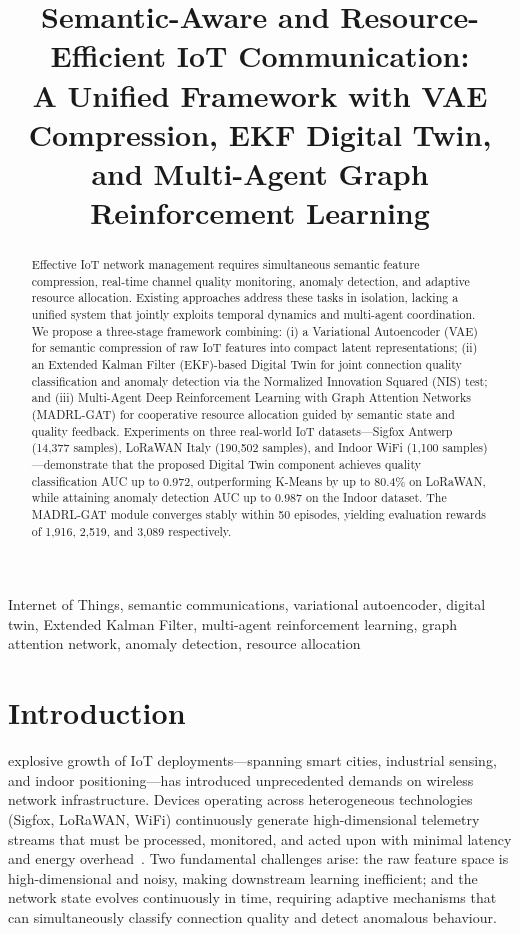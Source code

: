 \documentclass[conference]{IEEEtran}
\title{Semantic-Aware and Resource-Efficient IoT Communication:\\
A Unified Framework with VAE Compression, EKF Digital Twin,\\
and Multi-Agent Graph Reinforcement Learning}
\author{
\IEEEauthorblockN{Trang$^{1}$,
Hoang Trong Binh$^{1}$,
Nguyen Anh Khuong$^{1}$,
Pham Van Tiep$^{1}$,
Khanh$^{1}$,
Dinh Van Linh$^{1,\dagger}$}
\IEEEauthorblockA{$^{1}$[Department Name], [University Name], Vietnam\\
$^{\dagger}$Corresponding author: \texttt{[email]@[domain]}}
}
\begin{document}
\maketitle

\begin{abstract}
Effective IoT network management requires simultaneous semantic feature
compression, real-time channel quality monitoring, anomaly detection, and
adaptive resource allocation. Existing approaches address these tasks in
isolation, lacking a unified system that jointly exploits temporal dynamics
and multi-agent coordination. We propose a three-stage framework combining:
(i) a Variational Autoencoder (VAE) for semantic compression of raw IoT
features into compact latent representations; (ii) an Extended Kalman Filter
(EKF)-based Digital Twin for joint connection quality classification and
anomaly detection via the Normalized Innovation Squared (NIS) test; and
(iii) Multi-Agent Deep Reinforcement Learning with Graph Attention Networks
(MADRL-GAT) for cooperative resource allocation guided by semantic state
and quality feedback. Experiments on three real-world IoT datasets—Sigfox
Antwerp (14,377 samples), LoRaWAN Italy (190,502 samples), and Indoor WiFi
(1,100 samples)—demonstrate that the proposed Digital Twin component achieves
quality classification AUC up to 0.972, outperforming K-Means by up to
80.4\% on LoRaWAN, while attaining anomaly detection AUC up to 0.987 on
the Indoor dataset. The MADRL-GAT module converges stably within 50
episodes, yielding evaluation rewards of 1,916, 2,519, and 3,089
respectively.
\end{abstract}

\begin{IEEEkeywords}
Internet of Things, semantic communications, variational autoencoder,
digital twin, Extended Kalman Filter, multi-agent reinforcement learning,
graph attention network, anomaly detection, resource allocation
\end{IEEEkeywords}

\section{Introduction}
\label{sec:intro}

 explosive growth of IoT deployments—spanning smart
cities, industrial sensing, and indoor positioning—has introduced
unprecedented demands on wireless network infrastructure. Devices operating
across heterogeneous technologies (Sigfox, LoRaWAN, WiFi) continuously
generate high-dimensional telemetry streams that must be processed, monitored,
and acted upon with minimal latency and energy overhead~\cite{ref_iot_survey}.
Two fundamental challenges arise: the raw feature space is high-dimensional
and noisy, making downstream learning inefficient; and the network state
evolves continuously in time, requiring adaptive mechanisms that can
simultaneously classify connection quality and detect anomalous behaviour.
\end{document}
